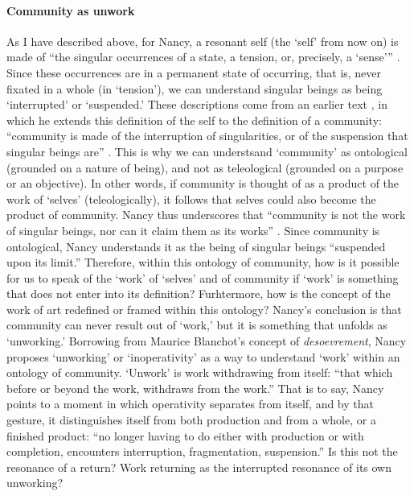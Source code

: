 \paragraph{Community as unwork}
As I have described above, for Nancy, a resonant self (the `self' from now on) is made of ``the singular occurrences of a state, a tension, or, precisely, a `sense''' \parencite[8]{Nan07:Lis}. Since these occurrences are in a permanent state of occurring, that is, never fixated in a whole (in `tension'), we can understand singular beings as being `interrupted' or `suspended.' These descriptions come from an earlier text \textcite{Nan91:The}, in which he extends this definition of the self to the definition of a community: ``community is made of the interruption of singularities, or of the suspension that singular beings are'' \parencite[31][All subsequent quotes from this passage.]{Nan91:The}. This is why we can understsand `community' as ontological (grounded on a nature of being), and not as teleological (grounded on a purpose or an objective). In other words, if community is thought of as a product of the work of `selves' (teleologically), it follows that selves could also become the product of community. Nancy thus underscores that ``community is not the work of singular beings, nor can it claim them as its works'' . Since community is ontological, Nancy understands it as the being of singular beings ``suspended upon its limit.'' Therefore, within this ontology of community, how is it possible for us to speak of the `work' of `selves' and of community if `work' is something that does not enter into its definition? Furhtermore, how is the concept of the work of art redefined or framed within this ontology? Nancy's conclusion is that community can never result out of `work,' but it is something that unfolds as `unworking.' Borrowing from Maurice Blanchot's concept of \textit{desoevrement}, Nancy proposes `unworking' or `inoperativity' as a way to understand `work' within an ontology of community. `Unwork' is work withdrawing from itself: ``that which before or beyond the work, withdraws from the work.'' That is to say, Nancy points to a moment in which operativity separates from itself, and by that gesture, it distinguishes itself from both production and from a whole, or a finished product: ``no longer having to do either with production or with completion, encounters interruption, fragmentation, suspension.'' Is this not the resonance of a return? Work returning as the interrupted resonance of its own unworking?

